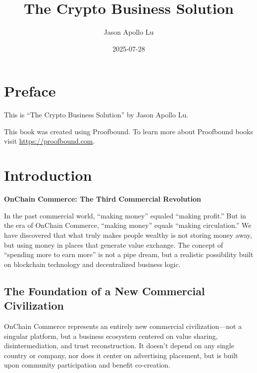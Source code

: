 \documentclass[
  Letterpaper,
]{scrbook}
\title{The Crypto Business Solution}
\author{Jason Apollo Lu}
\date{2025-07-28}
\renewcommand*\contentsname{Table of contents}
\newcommand\contentsname{Table of contents}
\begin{document}
\frontmatter
\maketitle

\renewcommand*\contentsname{Table of contents}
{
\setcounter{tocdepth}{1}
\tableofcontents
}

\mainmatter
{}

\chapter*{Preface}\label{preface}


This is ``The Crypto Business Solution'' by Jason Apollo Lu.

This book was created using Proofbound. To learn more about Proofbound
books visit \url{https://proofbound.com}.


\chapter{Introduction}\label{introduction}

\textbf{OnChain Commerce: The Third Commercial Revolution}

In the past commercial world, ``making money'' equaled ``making
profit.'' But in the era of OnChain Commerce, ``making money'' equals
``making circulation.'' We have discovered that what truly makes people
wealthy is not storing money away, but using money in places that
generate value exchange. The concept of ``spending more to earn more''
is not a pipe dream, but a realistic possibility built on blockchain
technology and decentralized business logic.

\section{The Foundation of a New Commercial
Civilization}\label{the-foundation-of-a-new-commercial-civilization}

OnChain Commerce represents an entirely new commercial
civilization---not a singular platform, but a business ecosystem
centered on value sharing, disintermediation, and trust reconstruction.
It doesn't depend on any single country or company, nor does it center
on advertising placement, but is built upon community participation and
benefit co-creation.
\end{document}
